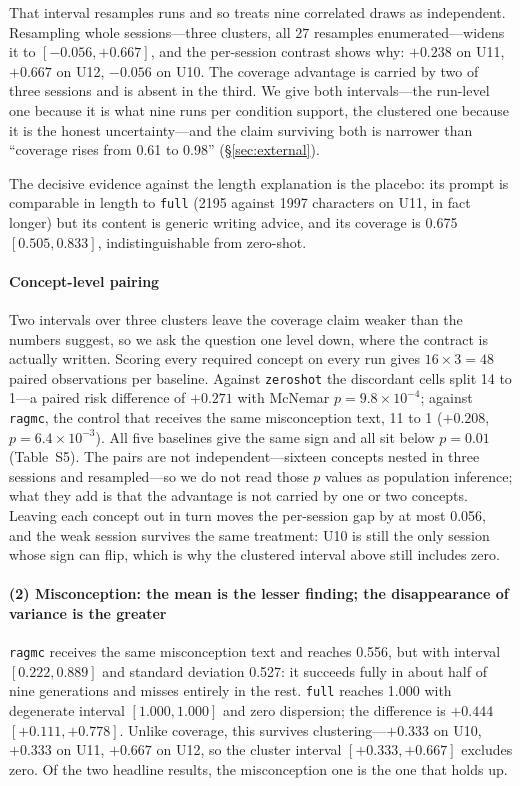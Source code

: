 \documentclass[review,12pt]{elsarticle}
\renewcommand{\_}{\kgunderscore\allowbreak}
\newcommand{\id}[1]{\texttt{#1}}
\begin{document}
That interval resamples runs and so treats nine correlated draws as independent.
Resampling whole sessions---three clusters, all $27$ resamples enumerated---widens
it to $[-0.056, +0.667]$, and the per-session contrast shows why: $+0.238$ on U11,
$+0.667$ on U12, $-0.056$ on U10. The coverage advantage is carried by two
of three sessions and is absent in the third. We give both intervals---the
run-level one because it is what nine runs per condition support, the clustered one
because it is the honest uncertainty---and the claim surviving both is narrower
than ``coverage rises from 0.61 to 0.98''
(\S\ref{sec:external}).

The decisive evidence against the length explanation is the placebo: its prompt is
comparable in length to \id{full} (2195 against 1997 characters on U11, in fact
longer) but its content is generic writing advice, and its coverage is 0.675
$[0.505, 0.833]$, indistinguishable from zero-shot.

\paragraph{Concept-level pairing} Two intervals over three clusters leave the
coverage claim weaker than the numbers suggest, so we ask the question one level
down, where the contract is actually written. Scoring every required concept on
every run gives $16 \times 3 = 48$ paired observations per baseline. Against
\id{zero\_shot} the discordant cells split 14 to 1---a paired risk difference of
$+0.271$ with McNemar $p=9.8\times10^{-4}$; against \id{rag\_mc}, the control
that receives the same misconception text, 11 to 1 ($+0.208$,
$p=6.4\times10^{-3}$). All five baselines give the same sign and all sit below
$p=0.01$ (Table~S5). The pairs are not independent---sixteen concepts nested in
three sessions and resampled---so we do not read those $p$ values as population
inference; what they add is that the advantage is not carried by one or two
concepts. Leaving each concept out in turn moves the per-session gap by at most
0.056, and the weak session survives the same treatment: U10 is still the only
session whose sign can flip, which is why the clustered interval above still
includes zero.

\paragraph{(2) Misconception: the mean is the lesser finding; the disappearance
of variance is the greater} \id{rag\_mc} receives the same misconception text and
reaches 0.556, but with interval $[0.222, 0.889]$ and standard deviation 0.527: it
succeeds fully in about half of nine generations and misses entirely in the rest.
\id{full} reaches 1.000 with degenerate interval $[1.000, 1.000]$ and zero
dispersion; the difference is $+0.444$ $[+0.111, +0.778]$. Unlike coverage, this
survives clustering---$+0.333$ on U10, $+0.333$ on U11, $+0.667$ on U12, so the
cluster interval $[+0.333, +0.667]$ excludes zero. Of the two headline
results, the misconception one is the one that holds up.
\end{document}
